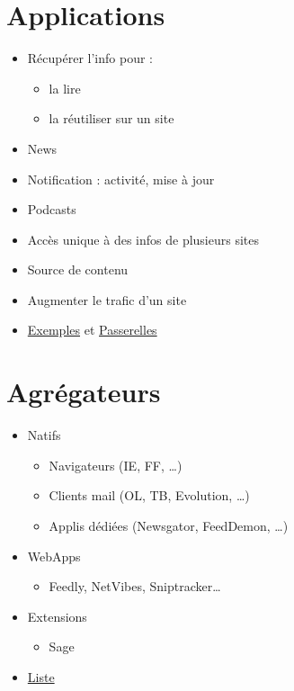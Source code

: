 \hypertarget{applications}{%
\section{Applications}\label{applications}}

\begin{itemize}
\tightlist
\item
  Récupérer l'info pour :

  \begin{itemize}
  \tightlist
  \item
    la lire
  \item
    la réutiliser sur un site
  \end{itemize}
\item
  News
\item
  Notification : activité, mise à jour
\item
  Podcasts
\item
  Accès unique à des infos de plusieurs sites
\item
  Source de contenu
\item
  Augmenter le trafic d'un site
\item
  \href{http://blog.louisgray.com/2008/11/30-different-uses-for-rss.html}{Exemples}
  et
  \href{http://www.makeuseof.com/tag/14-other-ways-to-use-rss-feeds/}{Passerelles}
\end{itemize}

\hypertarget{agruxe9gateurs}{%
\section{Agrégateurs}\label{agruxe9gateurs}}

\begin{itemize}
\tightlist
\item
  Natifs

  \begin{itemize}
  \tightlist
  \item
    Navigateurs (IE, FF, \ldots)
  \item
    Clients mail (OL, TB, Evolution, \ldots)
  \item
    Applis dédiées (Newsgator, FeedDemon, \ldots)
  \end{itemize}
\item
  WebApps

  \begin{itemize}
  \tightlist
  \item
    Feedly, NetVibes, Sniptracker\ldots{}
  \end{itemize}
\item
  Extensions

  \begin{itemize}
  \tightlist
  \item
    Sage
  \end{itemize}
\item
  \href{https://en.wikipedia.org/wiki/Comparison_of_feed_aggregators}{Liste}
\end{itemize}

